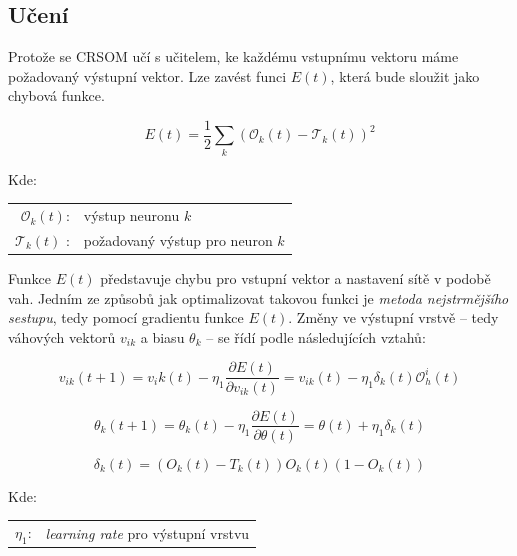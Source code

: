 \documentclass[thesis=M,czech]{FITthesis}[2012/06/26]
\begin{document}
\subsection{Učení}
Protože se CRSOM učí s učitelem, ke každému vstupnímu vektoru máme požadovaný výstupní vektor. Lze zavést funci $E(t)$, která bude sloužit jako chybová funkce.

\vspace{\baselineskip}
\noindent
\begin{minipage}[c]{\textwidth }

\begin{equation} \label{eq:e}
   E(t)=\frac{1}{2}\sum\limits_k{(\mathcal{O}_k(t)-\mathcal{T}_k(t))^2}  
\end{equation}


Kde:\\
\hspace*{3em}
\begin{tabular}{rl}
    $\mathcal{O}_k(t)$:& výstup neuronu $k$ \\
    $\mathcal{T}_k(t) $ :& požadovaný výstup pro neuron $k$ \\

\end{tabular}
\end{minipage} 
\vspace{\baselineskip}
\noindent


Funkce $E(t)$ představuje chybu pro vstupní vektor a nastavení sítě v podobě vah. Jedním ze způsobů jak optimalizovat takovou funkci je \textit{metoda nejstrmějšího sestupu}, tedy pomocí gradientu funkce $E(t)$. Změny ve výstupní vrstvě -- tedy váhových vektorů $v_{ik}$ a biasu $ \theta_k$ -- se řídí podle následujících vztahů:

\vspace{\baselineskip}
\noindent
\begin{minipage}[c]{\textwidth }

\begin{equation*}
   v_{ik}(t+1)=v_ik(t) - \eta_1\frac{\partial{E(t)}}{\partial{v_{ik}(t)}} =  v_{ik}(t) - \eta_1\delta_k(t)\mathcal{O}_h^i(t) 
\end{equation*}

\begin{equation*}
   \theta_k(t+1)=\theta_k(t) - \eta_1\frac{\partial{E(t)}}{\partial{\theta(t)}} = \theta(t)  + \eta_1\delta_k(t)
\end{equation*}

\begin{equation*}
   \delta_k(t) = (O_k(t) - T_k(t))O_k(t)(1-O_k(t)) 
\end{equation*}

Kde:\\
\hspace*{3em}
\begin{tabular}{rl}
    $\eta_1$:& \textit{learning rate} pro výstupní vrstvu \\
\end{tabular}
\end{minipage} 
\vspace{\baselineskip}
\noindent
\end{document}
